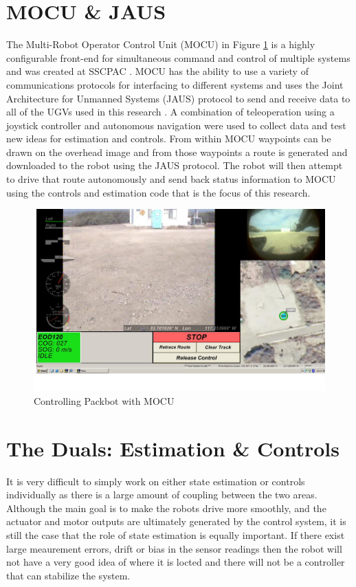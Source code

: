 \section{MOCU \& JAUS}
\label{sec:mocujaus}
The Multi-Robot Operator Control Unit (MOCU) in Figure \ref{fig:mocu} is a highly configurable front-end for simultaneous command and control of multiple systems and was created at SSCPAC \cite{PowellMOCU08}. MOCU has the ability to use a variety of communications protocols for interfacing to different systems and uses the Joint Architecture for Unmanned Systems (JAUS) protocol to send and receive data to all of the UGVs used in this research \cite{RoweJAUS08}. A combination of teleoperation using a joystick controller and autonomous navigation were used to collect data and test new ideas for estimation and controls. From within MOCU waypoints can be drawn on the overhead image and from those waypoints a route is generated and downloaded to the robot using the JAUS protocol. The robot will then attempt to drive that route autonomously and send back status information to MOCU using the controls and estimation code that is the focus of this research.

\begin{figure}[ht!]
	\centering
	\includegraphics[width=.75\textwidth]{images/mocuPackbotScreenshot}
	\caption{Controlling Packbot with MOCU}
	\label{fig:mocu}
\end{figure}

\section{The Duals: Estimation \& Controls}
\label{sec:duals}
It is very difficult to simply work on either state estimation or controls individually as there is a large amount of coupling between the two areas. Although the main goal is to make the robots drive more smoothly, and the actuator and motor outputs are ultimately generated by the control system, it is still the case that the role of state estimation is equally important. If there exist large meaurement errors, drift or bias in the sensor readings then the robot will not have a very good idea of where it is locted and there will not be a controller that can stabilize the system.

